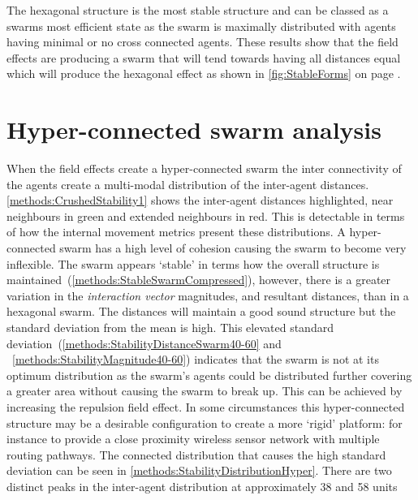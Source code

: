 The hexagonal structure is the most stable structure \cite{HT:2001} and can be classed as a swarms most efficient state as the swarm is maximally distributed with agents having minimal or no cross connected agents. These results show that the field effects are producing a swarm that will tend towards having all distances equal which will produce the hexagonal effect as shown in \autoref{fig:StableForms} on page \pageref{fig:StableForms}.

\section{Hyper-connected swarm analysis}\label{section:AnalysisB}
When the field effects create a hyper-connected swarm the inter connectivity of the agents create a multi-modal distribution of the inter-agent distances. \autoref{methods:CrushedStability1} shows the inter-agent distances highlighted, near neighbours in green and extended neighbours in red. This is detectable in terms of how the internal movement metrics present these distributions. A hyper-connected swarm has a high level of cohesion causing the swarm to become very inflexible. The swarm appears `stable' in terms how the overall structure is maintained~(\autoref{methods:StableSwarmCompressed}), however, there is a greater variation in the \textit{interaction vector} magnitudes, and resultant distances, than in a hexagonal swarm. The distances will maintain a good sound structure but the standard deviation from the mean is high. This elevated standard deviation~(\autoref{methods:StabilityDistanceSwarm40-60} and ~\ref{methods:StabilityMagnitude40-60}) indicates that the swarm is not at its optimum distribution as the swarm's agents could be distributed further covering a greater area without causing the swarm to break up. This can be achieved by increasing the repulsion field effect. In some circumstances this hyper-connected structure may be a desirable configuration to create a more `rigid' platform: for instance to provide a close proximity wireless sensor network with multiple routing pathways. The connected distribution that causes the high standard deviation can be seen in \autoref{methods:StabilityDistributionHyper}. There are two distinct peaks in the inter-agent distribution at approximately 38 and 58 units

